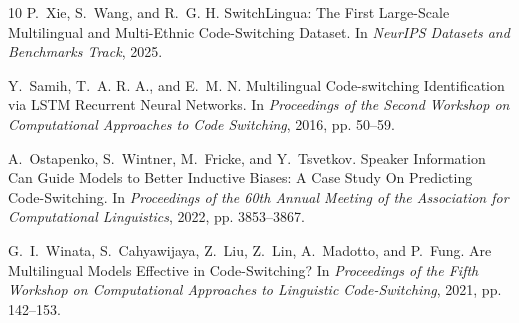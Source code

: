 \documentclass[sigconf,nonacm]{acmart}
\begin{document}
\begin{thebibliography}{10}
P.~Xie, S.~Wang, and R.~G. H.
\newblock SwitchLingua: The First Large-Scale Multilingual and Multi-Ethnic Code-Switching Dataset.
\newblock In \emph{NeurIPS Datasets and Benchmarks Track}, 2025.

Y.~Samih, T.~A. R. A., and E.~M. N.
\newblock Multilingual Code-switching Identification via LSTM Recurrent Neural Networks.
\newblock In \emph{Proceedings of the Second Workshop on Computational Approaches to Code Switching}, 2016, pp. 50--59.

A.~Ostapenko, S.~Wintner, M.~Fricke, and Y.~Tsvetkov.
\newblock Speaker Information Can Guide Models to Better Inductive Biases: A Case Study On Predicting Code-Switching.
\newblock In \emph{Proceedings of the 60th Annual Meeting of the Association for Computational Linguistics}, 2022, pp. 3853--3867.

G.~I.~Winata, S.~Cahyawijaya, Z.~Liu, Z.~Lin, A.~Madotto, and P.~Fung.
\newblock Are Multilingual Models Effective in Code-Switching?
\newblock In \emph{Proceedings of the Fifth Workshop on Computational Approaches to Linguistic Code-Switching}, 2021, pp. 142--153.

\end{thebibliography}
\end{document}
